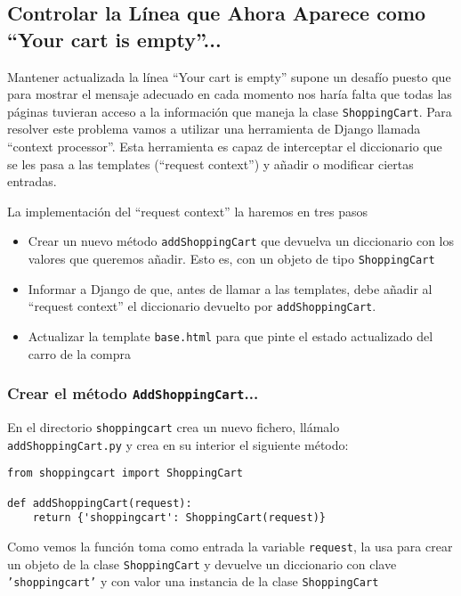 \documentclass[12pt]{article} %
\newcommand{\ttt}[1]{\texttt{#1}}%
\newcommand{\hhh}[1]{\texttt{#1}}%
\begin{document}
\subsection{Controlar la Línea que Ahora Aparece como ``Your cart is empty''...}

Mantener actualizada la línea ``Your cart is empty'' supone un desafío puesto que 
para mostrar el mensaje adecuado en cada momento nos haría falta que todas las páginas tuvieran acceso a la información que maneja la clase \ttt{ShoppingCart}. Para resolver este problema vamos a utilizar una herramienta de Django llamada ``context processor''. Esta herramienta es capaz de interceptar el diccionario que se les pasa a las templates 
(``request context'') y añadir o modificar ciertas entradas. 

La implementación del ``request context'' la haremos en tres pasos

\begin{itemize}
 \item Crear un nuevo método  \ttt{addShoppingCart} que devuelva un diccionario con los valores que queremos añadir. Esto es, con un objeto de tipo \ttt{ShoppingCart}
 \item Informar a Django de que, antes de llamar a las templates,  debe añadir al ``request context'' el diccionario devuelto por \ttt{addShoppingCart}.
 \item Actualizar la template \hhh{base.html} para que pinte el estado actualizado del carro de la compra
\end{itemize}

\subsubsection{Crear el método \ttt{AddShoppingCart}...}

En el directorio \ttt{shoppingcart} crea un nuevo fichero, llámalo \ttt{addShoppingCart.py} y crea en su interior el siguiente método:

\begin{lstlisting}
from shoppingcart import ShoppingCart

def addShoppingCart(request):
    return {'shoppingcart': ShoppingCart(request)}

\end{lstlisting}

Como vemos la función toma como entrada la variable \ttt{request}, la usa para crear un objeto de la clase \ttt{ShoppingCart} y devuelve un diccionario con clave \ttt{'shoppingcart'} y con valor una instancia de la clase \ttt{ShoppingCart}
\end{document}
